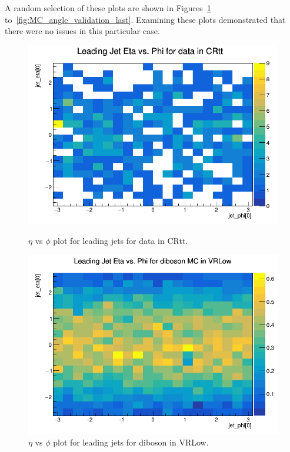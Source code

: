 A random selection of these plots are shown in Figures~\ref{fig:MC_angle_validation_first} to~\ref{fig:MC_angle_validation_last}. Examining these plots demonstrated that there were no issues in this particular case.

\begin{figure}[htbp]
\centering
\begin{minipage}{0.45\textwidth}
    \includegraphics[width=\textwidth]{Images/SUSY/jet_eta_phi_data_CRtt.png}
    \caption{$\eta$ vs $\phi$ plot for leading jets for data in CRtt.}
    \label{fig:MC_angle_validation_first}
\end{minipage}
\hfill
\begin{minipage}{0.45\textwidth}
    \includegraphics[width=\textwidth]{Images/SUSY/jet_eta_phi_diboson_VRLow.png}
    \caption{$\eta$ vs $\phi$ plot for leading jets for diboson in VRLow.}
\end{minipage}
\end{figure}

